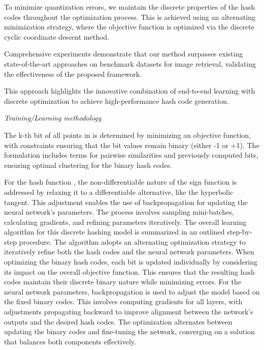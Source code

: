 To minimize quantization errors, we maintain the discrete properties of the hash codes throughout the optimization process. This is achieved using an alternating minimization strategy, where the objective function is optimized via the discrete cyclic coordinate descent method.

Comprehensive experiments demonstrate that our method surpasses existing state-of-the-art approaches on benchmark datasets for image retrieval, validating the effectiveness of the proposed framework.

This approach highlights the innovative combination of end-to-end learning with discrete optimization to achieve high-performance hash code generation.

\textit{Training/Learning methodology}
	
The k-th bit of all points in is determined by minimizing an objective function, with constraints ensuring that the bit values remain binary (either -1 or +1). The formulation includes terms for pairwise similarities and previously computed bits, ensuring optimal clustering for the binary hash codes.

For the hash function , the non-differentiable nature of the sign function is addressed by relaxing it to a differentiable alternative, like the hyperbolic tangent. This adjustment enables the use of backpropagation for updating the neural network's parameters. The process involves sampling mini-batches, calculating gradients, and refining parameters iteratively. The overall learning algorithm for this discrete hashing model is summarized in an outlined step-by-step procedure.
The algorithm adopts an alternating optimization strategy to iteratively refine both the hash codes and the neural network parameters. When optimizing the binary hash codes, each bit is updated individually by considering its impact on the overall objective function. This ensures that the resulting hash codes maintain their discrete binary nature while minimizing errors.
For the neural network parameters, backpropagation is used to adjust the model based on the fixed binary codes. This involves computing gradients for all layers, with adjustments propagating backward to improve alignment between the network's outputs and the desired hash codes. The optimization alternates between updating the binary codes and fine-tuning the network, converging on a solution that balances both components effectively.



